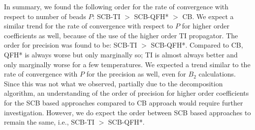         In summary, we found the following order for the rate of convergence with respect to number of beads $P$: SCB-TI $>$ SCB-QFH* $>$ CB. We expect a similar trend for the rate of convergence with respect to $P$ for higher order coefficients as well, because of the use of the higher order TI propagator. The order for precision was found to be: SCB-TI $>$ SCB-QFH*. Compared to CB, QFH* is always worse but only marginally so; TI is almost always better and only marginally worse for a few temperatures. We expected a trend similar to the rate of convergence with $P$ for the precision as well, even for $B_2$ calculations. Since this was not what we observed, partially due to the decomposition algorithm, an understanding of the order of precision for higher order coefficients for the SCB based approaches compared to CB approach would require further investigation. However, we do expect the order between SCB based approaches to remain the same, i.e., SCB-TI $>$ SCB-QFH*.
